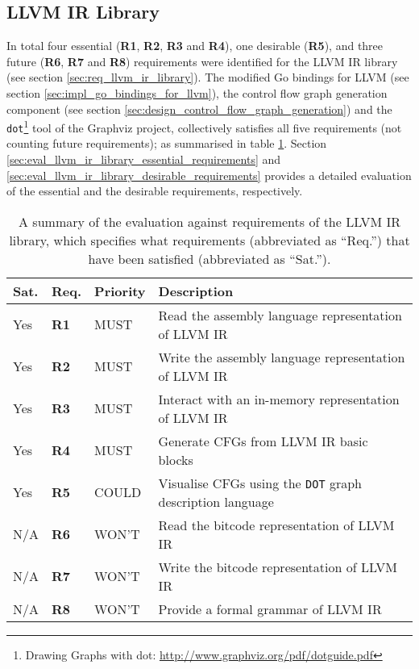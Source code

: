 
\subsection{LLVM IR Library}

In total four essential (\textbf{R1}, \textbf{R2}, \textbf{R3} and \textbf{R4}), one desirable (\textbf{R5}), and three future (\textbf{R6}, \textbf{R7} and \textbf{R8}) requirements were identified for the LLVM IR library (see section \ref{sec:req_llvm_ir_library}). The modified Go bindings for LLVM (see section \ref{sec:impl_go_bindings_for_llvm}), the control flow graph generation component (see section \ref{sec:design_control_flow_graph_generation}) and the \texttt{dot}\footnote{Drawing Graphs with dot: \url{http://www.graphviz.org/pdf/dotguide.pdf}} tool of the Graphviz project, collectively satisfies all five requirements (not counting future requirements); as summarised in table \ref{tbl:eval_summary_of_llvm_ir_library}. Section \ref{sec:eval_llvm_ir_library_essential_requirements} and \ref{sec:eval_llvm_ir_library_desirable_requirements} provides a detailed evaluation of the essential and the desirable requirements, respectively.

\begin{table}[htbp]
	\begin{center}
		\begin{tabular}{|l|l|l|l|}
			\hline
			Sat. & Req. & Priority & Description \\
			\hline
			\rowcolor{light_green_3}
			Yes & \textbf{R1} & MUST & Read the assembly language representation of LLVM IR \\
			\rowcolor{light_green_3}
			Yes & \textbf{R2} & MUST & Write the assembly language representation of LLVM IR \\
			\rowcolor{light_green_3}
			Yes & \textbf{R3} & MUST & Interact with an in-memory representation of LLVM IR \\
			\rowcolor{light_green_3}
			Yes & \textbf{R4} & MUST & Generate CFGs from LLVM IR basic blocks \\
			\hline
			\rowcolor{light_green_3}
			Yes & \textbf{R5} & COULD & Visualise CFGs using the \texttt{DOT} graph description language \\
			\hline
			N/A & \textbf{R6} & WON'T & Read the bitcode representation of LLVM IR \\
			N/A & \textbf{R7} & WON'T & Write the bitcode representation of LLVM IR \\
			N/A & \textbf{R8} & WON'T & Provide a formal grammar of LLVM IR \\
			\hline
		\end{tabular}
	\end{center}
	\caption{A summary of the evaluation against requirements of the LLVM IR library, which specifies what requirements (abbreviated as ``Req.'') that have been satisfied (abbreviated as ``Sat.'').}
	\label{tbl:eval_summary_of_llvm_ir_library}
\end{table}




